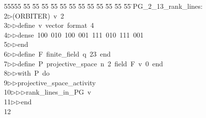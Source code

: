%
%
\begin{tabbing}
55555 \= 55 \= 55 \= 55 \= 55 \= 55 \= 55 \= 55 \= 55 \= 55 \= 55 \= 55 \= 55 \= \>PG\_2\_13\_rank\_lines:\\[0pt]
2\>$\triangleright$\>(ORBITER)\ v\ 2\ \\[0pt]
3\>$\triangleright$\>$\triangleright$\>define\ v\ vector\ format\ 4\ \\[0pt]
4\>$\triangleright$\>$\triangleright$\>dense\ 100\ 010\ 100\ 001\ 111\ 010\ 111\ 001\ \\[0pt]
5\>$\triangleright$\>$\triangleright$\>end\ \\[0pt]
6\>$\triangleright$\>$\triangleright$\>define\ F\ finite\_field\ q\ 23\ end\ \\[0pt]
7\>$\triangleright$\>$\triangleright$\>define\ P\ projective\_space\ n\ 2\ field\ F\ v\ 0\ end\ \\[0pt]
8\>$\triangleright$\>$\triangleright$\>with\ P\ do\ \\[0pt]
9\>$\triangleright$\>$\triangleright$\>projective\_space\_activity\ \\[0pt]
10\>$\triangleright$\>$\triangleright$\>$\triangleright$\>rank\_lines\_in\_PG\ v\ \\[0pt]
11\>$\triangleright$\>$\triangleright$\>end\ \\[0pt]
12\>\end{tabbing}
